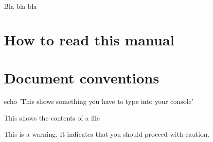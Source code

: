 
Bla bla bla

\section*{How to read this manual}
\section*{Document conventions}

\begin{shellverbatim}
echo 'This shows something you have to type into your console'
\end{shellverbatim}

\begin{wideshellverbatim}
This shows the contents of a file
\end{wideshellverbatim}

\begin{warning}
This is a warning. It indicates that you should proceed with caution.
\end{warning}